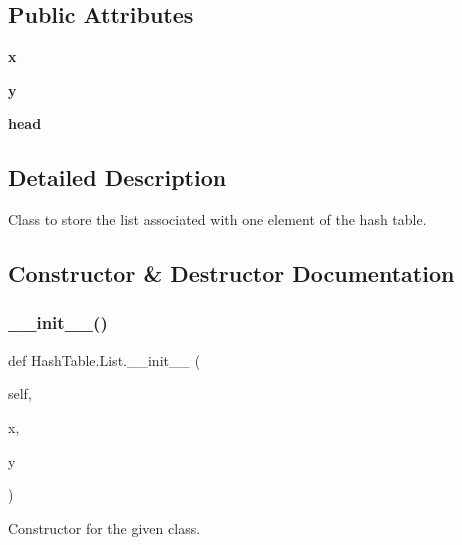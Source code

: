 \subsection*{Public Attributes}
\begin{DoxyCompactItemize}
\item 
\mbox{\label{class_hash_table_1_1_list_a22bd9f7848a534b560af82fafd45a40a}} 
{\bfseries x}
\item 
\mbox{\label{class_hash_table_1_1_list_aa1631c49226f763fbfca02adeaf35604}} 
{\bfseries y}
\item 
\mbox{\label{class_hash_table_1_1_list_a1a51fff99f28e2a98c03725e6aea66e0}} 
{\bfseries head}
\end{DoxyCompactItemize}


\subsection{Detailed Description}
Class to store the list associated with one element of the hash table. 

\subsection{Constructor \& Destructor Documentation}
\mbox{\label{class_hash_table_1_1_list_af469890a87f472122f5effd5438f04c7}} 
\subsubsection{\texorpdfstring{\+\_\+\+\_\+init\+\_\+\+\_\+()}{\_\_init\_\_()}}
{\footnotesize\ttfamily def Hash\+Table.\+List.\+\_\+\+\_\+init\+\_\+\+\_\+ (\begin{DoxyParamCaption}\item[{}]{self,  }\item[{}]{x,  }\item[{}]{y }\end{DoxyParamCaption})}



Constructor for the given class. 


